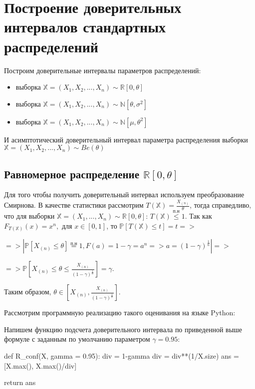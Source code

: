 \documentclass{article}
\begin{document}
\section{Построение доверительных интервалов стандартных распределений}

Построим доверительные интервалы параметров распределений:
\begin{itemize}
	\item выборка $\mathbb{X}=\left(X_1, X_2, ..., X_n\right) \sim \mathbb{R}\left[0, \theta\right]$
	\item выборка $\mathbb{X}=\left(X_1, X_2, ..., X_n\right) \sim \mathbb{N}\left[\theta, \sigma^2\right]$
	\item выборка $\mathbb{X}=\left(X_1, X_2, ..., X_n\right) \sim \mathbb{N}\left[\mu, \theta^2\right]$
\end{itemize}
И асимптотический доверительный интервал параметра распределения выборки $\mathbb{X}=\left(X_1, X_2, ..., X_n\right) \sim Be(\theta)$
\subsection{Равномерное распределение $\mathbb{R}[0, \theta]$}
Для того чтобы получить доверительный интервал используем преобразование Смирнова. В качестве статистики рассмотрим $T(\mathbb{X}) = \frac{X_{(n)}}{\theta}$, тогда справедливо, что для выборки $\mathbb{X}=\left(X_1,...,X_n\right)\sim\mathbb{R}[0, \theta]$: $T(\mathbb{X}) \stackrel{\text{п.н}}{\le} 1$. Так как $F_{T(\mathbb{X})}(x) = x^n, \text{ для } x \in [0, 1]$, то $\mathbb{P}\left[T(\mathbb{X}) \le t\right] = t =>$

$=>\left|\mathbb{P}\left[X_{(n)}\le \theta\right] \stackrel{\text{п.н}}{=} 1, F(a) = 1-\gamma = a^n => a = (1-\gamma)^\frac{1}{n}\right| =>$

$ => \mathbb{P}\left[X_{(n)} \le \theta \le \frac{X_{(n)}}{(1-\gamma)^\frac{1}{n}}\right] = \gamma$. 

Таким образом, $\theta \in \left[X_{(n)}, \frac{X_{(n)}}{(1-\gamma)^\frac{1}{n}}\right]$.

Рассмотрим программную реализацию такого оценивания на языке Python:

Напишем функцию подсчета доверительного интервала по приведенной выше формуле с заданным по умолчанию параметром $\gamma=0.95$:

\begin{python}
def R_conf(X, gamma = 0.95):
	div = 1-gamma
	div = div**(1/X.size)
	ans = [X.max(), X.max()/div]

	return ans
\end{python}
\end{document}
